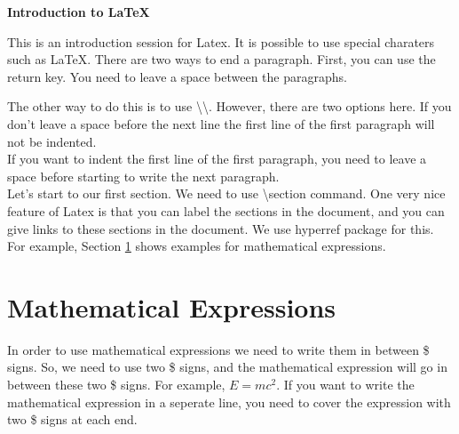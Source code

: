 \documentclass[12pt]{article}
\begin{document}
\begin{center}

\begin{Large}
\textbf{Introduction to LaTeX}
\end{Large}

\end{center}

This is an introduction session for Latex. It is possible to use special charaters such as \LaTeX. There are two ways to end a paragraph. First, you can use the return key. You need to leave a space between the paragraphs.

The other way to do this is to use \textbackslash \textbackslash. However, there are two options here. If you don't leave a space before the next line the first line of the first paragraph will not be indented. \\
If you want to indent the first line of the first paragraph, you need to leave a space before starting to write the next paragraph. \\

Let's start to our first section. We need to use \textbackslash section command. One very nice feature of Latex is that you can label the sections in the document, and you can give links to these sections in the document. We use hyperref package for this. For example, Section \ref{mathExp} shows examples for mathematical expressions. \\

\section{Mathematical Expressions} \label{mathExp}

In order to use mathematical expressions we need to write them in between \$ signs. So, we need to use two \$ signs, and the mathematical expression will go in between these two \$ signs. For example, $E = mc^2$. If you want to write the mathematical expression in a seperate line, you need to cover the expression with two \$ signs at each end. 
\end{document}
